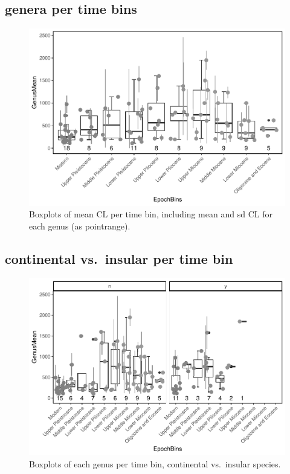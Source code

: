 \documentclass[]{article}
\begin{document}
\subsection{genera per time bins}\label{genera-per-time-bins}

\begin{figure}[htbp]
\centering
\includegraphics{MA_JJ_files/figure-latex/Boxplots of each genus per time bin-1.pdf}
\caption{Boxplots of mean CL per time bin, including mean and sd CL for
each genus (as pointrange).}
\end{figure}

\subsection{continental vs.~insular per time
bin}\label{continental-vs.insular-per-time-bin}

\begin{figure}[htbp]
\centering
\includegraphics{MA_JJ_files/figure-latex/Boxplots of each genus per time bin, continental vs. insular-1.pdf}
\caption{Boxplots of each genus per time bin, continental vs.~insular
species.}
\end{figure}
\end{document}

